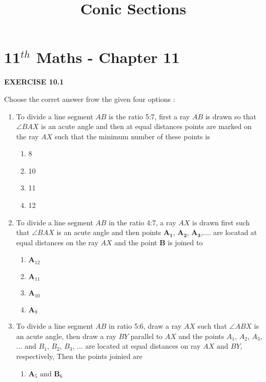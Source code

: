 \documentclass[12pt]{article}
\let\vec\mathbf
\begin{document}
\begin{center}
\enlargethispage{-4cm}
\title{\textbf{Conic Sections}}
\date{\vspace{-5ex}} %
\maketitle
\end{center}
\setcounter{page}{1}
\section*{11$^{th}$ Maths - Chapter 11}
\begin{center}
\textbf{EXERCISE 10.1}
\end{center}
Choose the corret answer frow the given four options :
\begin{enumerate}
\item To divide a line segment $AB$ is the ratio 5:7, first a ray $AB$ is drawn so that $\angle{BAX}$ is an acute angle and then at equal distances points are marked on the ray $AX$ such that the minimum number of these points is 
\begin{enumerate}
\item 8
\item 10
\item 11
\item 12
\end{enumerate}
\item To divide a line segment $AB$ in the ratio 4:7, a ray $AX$ is drawn first such that $\angle{BAX}$ is an acute angle and then points $\vec{A_1}$, $\vec{A_2}$, $\vec{A_3}$,.... are locatad at equal distances on the ray $AX$ and the point $\vec{B}$ is joined to 
\begin{enumerate}
	\item $\vec{A}_{12}$
	\item $\vec{A}_{11}$
	\item $\vec{A}_{10}$
	\item $\vec{A}_9$
\end{enumerate}
\item To divide a line segment $AB$ in ratio 5:6, draw a ray $AX$ such that $\angle{ABX}$ is an acute angle, then draw a ray $BY$ parallel to $AX$ and the points $A_1$, $A_2$, $A_3$, ... and $B_1$, $B_2$, $B_3$, ... are located at equal distances on ray $AX\text{ and }BY$, respectively, Then the points joinied are 
\begin{enumerate}
\item $\vec{A}_5\text{ and }\vec{B}_6$

\end{enumerate}
\end{enumerate}
\end{document}
